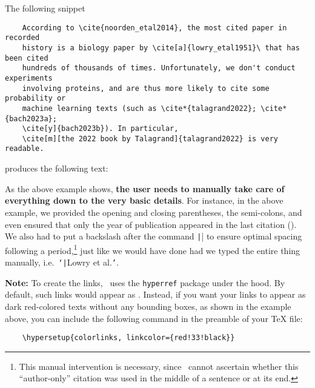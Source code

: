 \documentclass[letter, 11pt]{article}
\begin{document}
  The following snippet
  \begin{verbatim}
    According to \cite{noorden_etal2014}, the most cited paper in recorded
    history is a biology paper by \cite[a]{lowry_etal1951}\ that has been cited
    hundreds of thousands of times. Unfortunately, we don't conduct experiments
    involving proteins, and are thus more likely to cite some probability or
    machine learning texts (such as \cite*{talagrand2022}; \cite*{bach2023a};
    \cite[y]{bach2023b}). In particular,
    \cite[m][the 2022 book by Talagrand]{talagrand2022} is very readable.
  \end{verbatim}
  produces the following text:
  \begin{center}
  \end{center}
  
  As the above example shows, \textbf{the user needs to manually take care of everything down to the very basic details}. For instance, in the above example, we provided the opening and closing parentheses, the semi-colons, and even ensured that only the year of publication appeared in the last citation (\cite*{bach2023b}). We also had to put a backslash after the command \texttt|\cite[a]{lowry_etal1951}| to ensure optimal spacing following a period,\footnote{This manual intervention is necessary, since \dumbib\ cannot ascertain whether this ``author-only'' citation was used in the middle of a sentence or at its end.} just like we would have done had we typed the entire thing manually, i.e.\ \texttt{`}\texttt|Lowry et al.\|\texttt{'}.

  \noindent \textbf{Note:}  To create the links, \dumbib\ uses the \texttt{hyperref} package under the hood. By default, such links would appear as . Instead, if you want your links to appear as dark red-colored texts without any bounding boxes, as shown in the example above, you can include the following command in the preamble of your \TeX{} file:
  \begin{verbatim}
    \hypersetup{colorlinks, linkcolor={red!33!black}}
  \end{verbatim}
\end{document}
